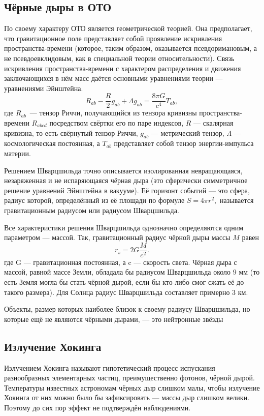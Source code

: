 \documentclass[a4paper, 12pt]{extarticle}
\begin{document}
  \subsection{Чёрные дыры в ОТО}

  По своему характеру ОТО является геометрической теорией. Она предполагает, что гравитационное поле
  представляет собой проявление искривления пространства-времени (которое, таким образом,
  оказывается псевдоримановым, а не псевдоевклидовым, как в специальной теории относительности).
  Связь искривления пространства-времени с характером распределения и движения заключающихся в нём
  масс даётся основными уравнениями теории — уравнениями Эйнштейна.
  \[
    R_{ab} - \frac{R}{2}  g_{ab} + \Lambda g_{ab} = \frac{8 \pi G}{c^4} T_{ab},
  \]
  где $R_{ab}$~--- тензор Риччи, получающийся из тензора кривизны пространства-времени $R_{abcd}$
  посредством свёртки его по паре индексов, $R$ — скалярная кривизна, то есть свёрнутый тензор
  Риччи, $g_{ab}$ — метрический тензор, $\Lambda$ — космологическая постоянная, а $T_{ab}$
  представляет собой тензор энергии-импульса материи.

  Решением Шварцшильда точно описывается изолированная невращающаяся, незаряженная и не испаряющаяся
  чёрная дыра (это сферически симметричное решение уравнений
  Эйнштейна в вакууме). Её горизонт событий — это сфера, радиус которой, определённый из её площади
  по формуле $S=4\pi r^2,$ называется гравитационным радиусом или радиусом Шварцшильда.

  Все характеристики решения Шварцшильда однозначно определяются одним параметром — массой. Так,
  гравитационный радиус чёрной дыры массы $M$ равен
  \[
      \boxed{
        r_s = 2G\frac{M}{c^2}.
      }
    \]
  где G — гравитационная постоянная, а c — скорость света. Чёрная дыра с массой, равной массе Земли,
  обладала бы радиусом Шварцшильда около 9 мм (то есть Земля могла бы стать чёрной дырой, если бы
  кто-либо смог сжать её до такого размера). Для Солнца радиус Шварцшильда составляет примерно 3 км.

  Объекты, размер которых наиболее близок к своему радиусу Шварцшильда, но которые ещё не являются
  чёрными дырами, — это нейтронные звёзды

  \subsection{Излучение Хокинга}

  Излучением Хокинга называют гипотетический процесс испускания разнообразных элементарных частиц,
  преимущественно фотонов, чёрной дырой. Температуры известных астрономам чёрных дыр слишком малы,
  чтобы излучение Хокинга от них можно было бы зафиксировать — массы дыр слишком велики. Поэтому до
  сих пор эффект не подтверждён наблюдениями.
\end{document}
